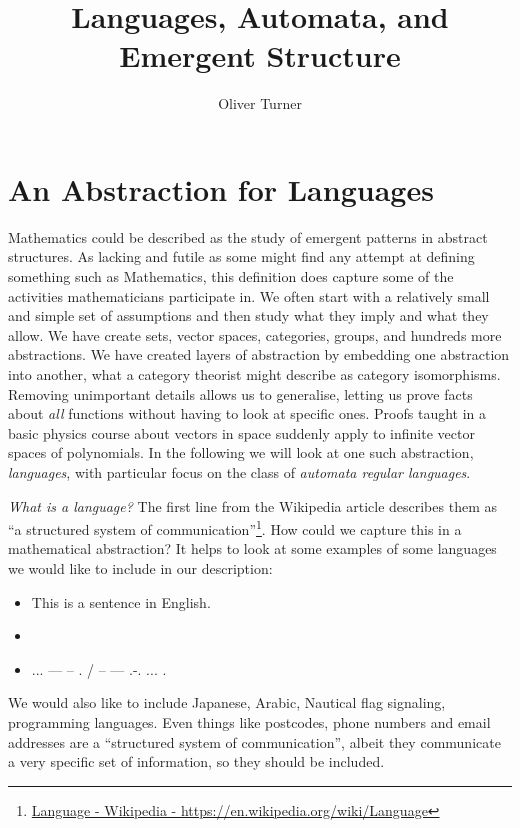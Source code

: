 \documentclass[a4paper]{article}
\title{\textbf{Languages, Automata, and Emergent Structure}}
\author{
Oliver Turner%
}
\theoremstyle{definition}
\theoremstyle{definition}
\theoremstyle{definition}
\begin{document}

\maketitle
\tableofcontents

\section{An Abstraction for Languages}

Mathematics could be described as the study of emergent patterns in abstract structures. As lacking and futile as some might find any attempt at defining something such as Mathematics, this definition does capture some of the activities mathematicians participate in. We often start with a relatively small and simple set of assumptions and then study what they imply and what they allow. We have create sets, vector spaces, categories, groups, and hundreds more abstractions. We have created layers of abstraction by embedding one abstraction into another, what a category theorist might describe as category isomorphisms. Removing unimportant details allows us to generalise, letting us prove facts about \emph{all} functions without having to look at specific ones. Proofs taught in a basic physics course about vectors in space suddenly apply to infinite vector spaces of polynomials. In the following we will look at one such abstraction, \emph{languages}, with particular focus on the class of \emph{automata regular languages}.

\emph{What is a \emph{language}?} The first line from the Wikipedia article describes them as ``a structured system of communication''\footnote{\href{https://en.wikipedia.org/wiki/Language}{Language - Wikipedia - https://en.wikipedia.org/wiki/Language}}. How could we capture this in a mathematical abstraction? It helps to look at some examples of some languages we would like to include in our description:
\begin{itemize}
    \item This is a sentence in English.
    \item {}
    \item ... --- -- . / -- --- .-. ... .
\end{itemize}

We would also like to include Japanese, Arabic, Nautical flag signaling, programming languages. Even things like postcodes, phone numbers and email addresses are a ``structured system of communication'', albeit they communicate a very specific set of information, so they should be included.
\end{document}
